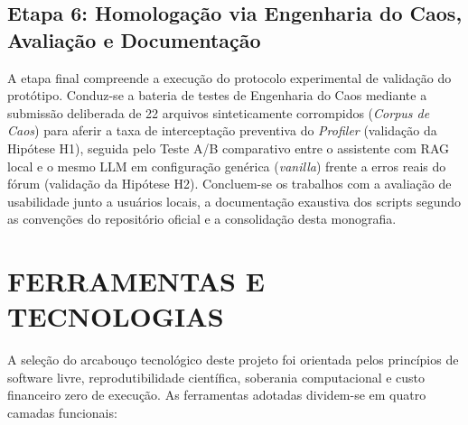 \documentclass[
	oneside,
	a4paper,
	12pt,
	chapter=TITLE,
	section=TITLE,
	english,
	brazilian
]{abntex2}
\begin{document}
\FloatBarrier
\subsection{Etapa 6: Homologação via Engenharia do Caos, Avaliação e Documentação}\label{sec:etapa_6_homologacao_via_engenharia_do_ca}


A etapa final compreende a execução do protocolo experimental de validação do protótipo. Conduz-se a bateria de testes de Engenharia do Caos mediante a submissão deliberada de 22 arquivos sinteticamente corrompidos (\textit{Corpus de Caos}) para aferir a taxa de interceptação preventiva do \textit{Profiler} (validação da Hipótese H1), seguida pelo Teste A/B comparativo entre o assistente com RAG local e o mesmo LLM em configuração genérica (\textit{vanilla}) frente a erros reais do fórum (validação da Hipótese H2). Concluem-se os trabalhos com a avaliação de usabilidade junto a usuários locais, a documentação exaustiva dos scripts segundo as convenções do repositório oficial e a consolidação desta monografia.

\FloatBarrier
\section{FERRAMENTAS E TECNOLOGIAS}\label{sec:ferramentas_e_tecnologias}


A seleção do arcabouço tecnológico deste projeto foi orientada pelos princípios de software livre, reprodutibilidade científica, soberania computacional e custo financeiro zero de execução. As ferramentas adotadas dividem-se em quatro camadas funcionais:
\end{document}

